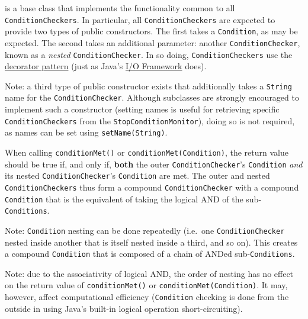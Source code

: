 \documentclass{article}
\begin{document}
 is a base class that implements the functionality common to all {\tt ConditionCheckers}. In particular, all {\tt ConditionCheckers} are expected to provide two types of public constructors. The first takes a {\tt Condition}, as may be expected. The second takes an additional parameter: another {\tt ConditionChecker}, known as a \textit{nested} {\tt ConditionChecker}. In so doing, {\tt ConditionCheckers} use the \href{https://en.wikipedia.org/wiki/Decorator_pattern}{decorator pattern} (just as Java's \href{https://docs.oracle.com/javase/7/docs/api/java/io/package-summary.html}{I/O Framework} does).

\begin{sideblock}
Note: a third type of public constructor exists that additionally takes a {\tt String} name for the {\tt ConditionChecker}. Although subclasses are strongly encouraged to implement such a constructor (setting names is useful for retrieving specific {\tt ConditionCheckers} from the {\tt StopConditionMonitor}), doing so is not required, as names can be set using {\tt setName(String)}.
\end{sideblock}

When calling {\tt conditionMet()} or {\tt conditionMet(Condition)}, the return value should be true if, and only if, \textbf{both} the outer {\tt ConditionChecker}'s {\tt Condition} \textit{and} its nested {\tt ConditionChecker}'s {\tt Condition} are met. The outer and nested {\tt ConditionCheckers} thus form a compound {\tt ConditionChecker} with a compound {\tt Condition} that is the equivalent of taking the logical AND of the sub-{\tt Conditions}.

\begin{sideblock}
Note: {\tt Condition} nesting can be done repeatedly (i.e.\ one {\tt ConditionChecker} nested inside another that is itself nested inside a third, and so on). This creates a compound {\tt Condition} that is composed of a chain of ANDed sub-{\tt Conditions}.
\end{sideblock}

\begin{sideblock}
Note: due to the associativity of logical AND, the order of nesting has no effect on the return value of {\tt conditionMet()} or {\tt conditionMet(Condition)}. It may, however, affect computational efficiency ({\tt Condition} checking is done from the outside in using Java's built-in logical operation short-circuiting).
\end{sideblock}
\end{document}
